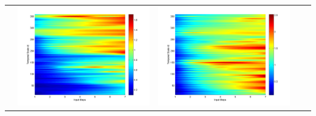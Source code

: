 \documentclass[11pt]{article}
\begin{document}
\begin{table}[H]
{\begin{tabular}{ccccc}
&\begin{minipage}{.3\textwidth}\includegraphics[width=\linewidth]{resultgraph/05585000p.png}\end{minipage}
&\begin{minipage}{.3\textwidth}\includegraphics[width=\linewidth]{resultgraph/05585000pep.png}\end{minipage}

\end{tabular}}
\end{table}
\end{document}
